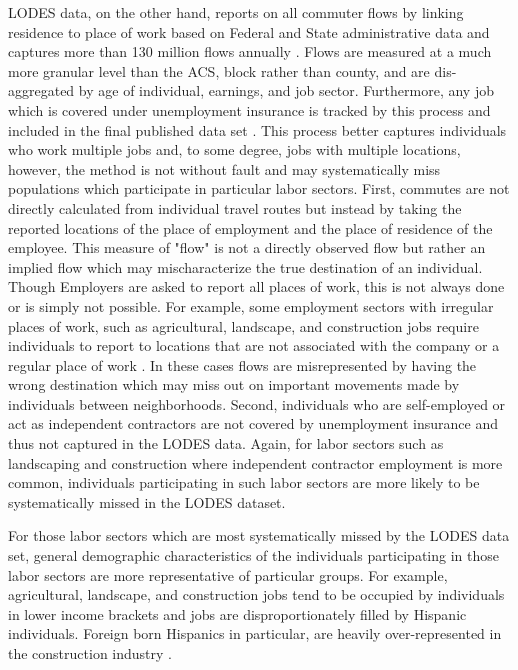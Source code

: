 \documentclass[fleqn,10pt]{olplainarticle}
\begin{document}
LODES data, on the other hand, reports on all commuter flows by linking residence to place of work based on Federal and State administrative data and captures more than 130 million flows annually \citep{}. Flows are measured at a much more granular level than the ACS, block rather than county, and are dis-aggregated by age of individual, earnings, and job sector. Furthermore, any job which is covered under unemployment insurance is tracked by this process and included in the final published data set \citep{}. This process better captures individuals who work multiple jobs and, to some degree, jobs with multiple locations, however, the method is not without fault and may systematically miss populations which participate in particular labor sectors. First, commutes are not directly calculated from individual travel routes but instead by taking the reported locations of the place of employment and the place of residence of the employee. This measure of "flow" is not a directly observed flow but rather an implied flow which may mischaracterize the true destination of an individual. Though Employers are asked to report all places of work, this is not always done or is simply not possible. For example, some employment sectors with irregular places of work, such as agricultural, landscape, and construction jobs require individuals to report to locations that are not associated with the company or a regular place of work \citep{}. In these cases flows are misrepresented by having the wrong destination which may miss out on important movements made by individuals between neighborhoods. Second, individuals who are self-employed or act as independent contractors are not covered by unemployment insurance and thus not captured in the LODES data. Again, for labor sectors such as landscaping and construction where independent contractor employment is more common, individuals participating in such labor sectors are more likely to be systematically missed in the LODES dataset.

For those labor sectors which are most systematically missed by the LODES data set, general demographic characteristics of the individuals participating in those labor sectors are more representative of particular groups. For example, agricultural, landscape, and construction jobs tend to be occupied by individuals in lower income brackets \citep{} and jobs are disproportionately filled by Hispanic individuals. Foreign born Hispanics in particular, are heavily over-represented in the construction industry \citep{}.
\end{document}
